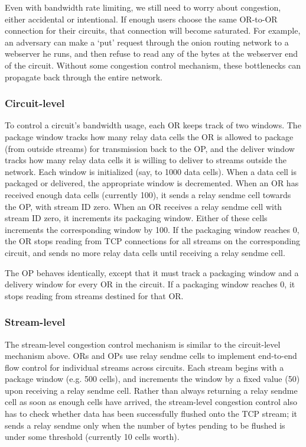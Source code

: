 \documentclass[times,10pt,twocolumn]{article}
\begin{document}
\label{subsec:congestion}

Even with bandwidth rate limiting, we still need to worry about
congestion, either accidental or intentional. If enough users choose
the same OR-to-OR connection for their circuits, that connection
will become saturated. For example, an adversary can make a `put'
request through the onion routing network to a webserver he runs,
and then refuse to read any of the bytes at the webserver end of the
circuit. Without some congestion control mechanism, these bottlenecks
can propagate back through the entire network.

\subsubsection{Circuit-level}

To control a circuit's bandwidth usage, each OR keeps track of two
windows. The package window tracks how many relay data cells the OR is
allowed to package (from outside streams) for transmission back to the OP,
and the deliver window tracks how many relay data cells it is willing
to deliver to streams outside the network. Each window is initialized
(say, to 1000 data cells). When a data cell is packaged or delivered,
the appropriate window is decremented. When an OR has received enough
data cells (currently 100), it sends a relay sendme cell towards the OP,
with stream ID zero. When an OR receives a relay sendme cell with stream
ID zero, it increments its packaging window. Either of these cells
increments the corresponding window by 100. If the packaging window
reaches 0, the OR stops reading from TCP connections for all streams
on the corresponding circuit, and sends no more relay data cells until
receiving a relay sendme cell.

The OP behaves identically, except that it must track a packaging window
and a delivery window for every OR in the circuit. If a packaging window
reaches 0, it stops reading from streams destined for that OR.

\subsubsection{Stream-level}

The stream-level congestion control mechanism is similar to the
circuit-level mechanism above. ORs and OPs use relay sendme cells
to implement end-to-end flow control for individual streams across
circuits. Each stream begins with a package window (e.g. 500 cells),
and increments the window by a fixed value (50) upon receiving a relay
sendme cell. Rather than always returning a relay sendme cell as soon
as enough cells have arrived, the stream-level congestion control also
has to check whether data has been successfully flushed onto the TCP
stream; it sends a relay sendme only when the number of bytes pending
to be flushed is under some threshold (currently 10 cells worth).
\end{document}
